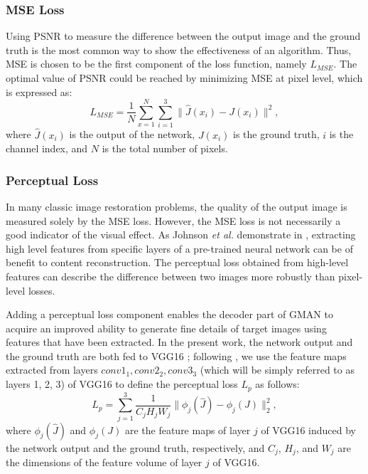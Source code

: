 \documentclass[journal]{IEEEtran}
\begin{document}
\subsubsection{MSE Loss}

Using PSNR to measure the difference between the output image and the ground truth is the most common way to show the effectiveness of an algorithm. Thus, MSE is chosen to be the first component of the loss function, namely $L_{MSE}$. The optimal value of PSNR could be reached by minimizing MSE at pixel level, which is expressed as:
\begin{equation}
L_{MSE}=\frac{1}{N}\sum_{x=1}^{N}\sum_{i=1}^{3}\parallel\hat{J}(x_{i})-J(x_{i})\parallel^2,
\end{equation}
where $\hat{J}(x_{i})$ is the output of the network, $J(x_{i})$ is the ground truth, $i$ is the channel index, and $N$ is the total number of pixels.

\subsubsection{Perceptual Loss}

In many classic image restoration problems, the quality of the output image is measured solely by the MSE loss. However, the MSE loss is not necessarily a good indicator of the visual effect. As Johnson \textit{et al.} demonstrate in \cite{johnson2016perceptual}, extracting high level features from specific layers of a pre-trained neural network can be of benefit to content reconstruction. The perceptual loss obtained from high-level features can describe the difference between two images more robustly than pixel-level losses.

Adding a perceptual loss component enables the decoder part of GMAN to acquire an improved ability to generate fine details of target images using features that have been extracted. In the present work, the network output and the ground truth are both fed to VGG16 \cite{VGG16}; following \cite{johnson2016perceptual}, we use the feature maps extracted from layers \textit{$conv1_1, conv2_2, conv3_3$} (which will be simply referred to as layers 1, 2, 3) of VGG16 to define the perceptual loss $L_{p}$ as follows:
\begin{equation}\label{perceptual loss}
L_{p}=\sum\limits_{j=1}^3\frac{1}{C_{j}H_{j}W_{j}}\parallel\phi_{j}(\hat{J})-\phi_{j}(J)\parallel^{2}_{2},
\end{equation}
where $\phi_j(\hat J)$ and $\phi_j(J)$ are the feature maps of  layer $j$ of VGG16 induced by the network output and the ground truth, respectively, and $C_j$, $H_j$, and $W_j$ are the dimensions of the feature volume of layer $j$ of VGG16.
 
\end{document}
